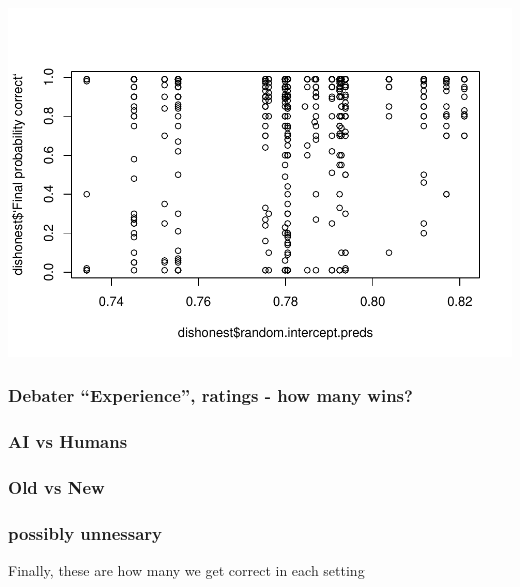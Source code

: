 \documentclass[
]{article}
\newenvironment{Shaded}{\begin{snugshade}}{\end{snugshade}}
\newcommand{\FunctionTok}[1]{\textcolor[rgb]{0.13,0.29,0.53}{\textbf{#1}}}
\newcommand{\NormalTok}[1]{#1}
\newcommand{\OtherTok}[1]{\textcolor[rgb]{0.56,0.35,0.01}{#1}}
\newcommand{\SpecialCharTok}[1]{\textcolor[rgb]{0.81,0.36,0.00}{\textbf{#1}}}
\begin{document}
\includegraphics{debate-2309_files/figure-latex/unnamed-chunk-3-9.pdf}

\subsubsection{Debater ``Experience'', ratings - how many
wins?}\label{debater-experience-ratings---how-many-wins}

\subsubsection{AI vs Humans}\label{ai-vs-humans}

\subsubsection{Old vs New}\label{old-vs-new}

\subsubsection{possibly unnessary}\label{possibly-unnessary}

Finally, these are how many we get correct in each setting

\begin{Shaded}
\end{Shaded}
\end{document}
